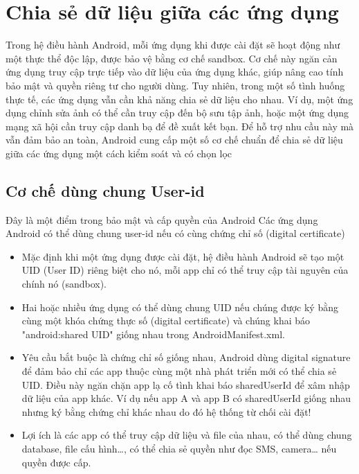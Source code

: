 \section{Chia sẻ dữ liệu giữa các ứng dụng}

  \hspace*{0.8cm}Trong hệ điều hành Android, mỗi ứng dụng khi được cài đặt sẽ hoạt động như một thực thể độc lập, được bảo vệ bằng cơ chế sandbox. Cơ chế này ngăn cản ứng dụng truy cập trực tiếp vào dữ liệu của ứng dụng khác, giúp nâng cao tính bảo mật và quyền riêng tư cho người dùng. Tuy nhiên, trong một số tình huống thực tế, các ứng dụng vẫn cần khả năng chia sẻ dữ liệu cho nhau. Ví dụ, một ứng dụng chỉnh sửa ảnh có thể cần truy cập đến bộ sưu tập ảnh, hoặc một ứng dụng mạng xã hội cần truy cập danh bạ để đề xuất kết bạn. Để hỗ trợ nhu cầu này mà vẫn đảm bảo an toàn, Android cung cấp một số cơ chế chuẩn để chia sẻ dữ liệu giữa các ứng dụng một cách kiểm soát và có chọn lọc

\subsection{Cơ chế dùng chung User-id}
\renewcommand{\labelitemi}{--}    
        \hspace*{0.8cm}Đây là một điểm trong bảo mật và cấp quyền của Android Các ứng dụng Android có thể dùng chung user-id nếu có cùng chứng chỉ số (digital certificate)
        \setlength{\leftmargini}{1.5cm}
        \begin{itemize}
            \item Mặc định khi một ứng dụng được cài đặt, hệ điều hành Android sẽ tạo một UID (User ID) riêng biệt cho nó, mỗi app chỉ có thể truy cập tài nguyên của chính nó (sandbox).
            \item Hai hoặc nhiều ứng dụng có thể dùng chung UID nếu chúng được ký bằng cùng một khóa chứng thực số (digital certificate) và chúng khai báo "android:shared UID" giống nhau trong AndroidManifest.xml.
            \item Yêu cầu bắt buộc là chứng chỉ số giống nhau, Android dùng digital signature để đảm bảo chỉ các app thuộc cùng một nhà phát triển mới có thể chia sẻ UID. Điều này ngăn chặn app lạ cố tình khai báo sharedUserId để xâm nhập dữ liệu của app khác.
            Ví dụ nếu app A và app B có sharedUserId giống nhau nhưng ký bằng chứng chỉ khác nhau do đó hệ thống từ chối cài đặt!
            \item Lợi ích là các app có thể truy cập dữ liệu và file của nhau, có thể dùng chung database, file cấu hình…, có thể chia sẻ quyền như đọc SMS, camera… nếu quyền được cấp.
        \end{itemize}
